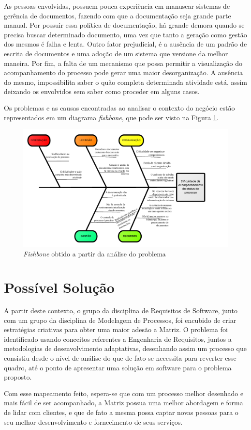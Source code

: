 As pessoas envolvidas, possuem pouca experiència em manusear 
sistemas de gerência de documentos, fazendo com que a documentação seja grande parte manual. Por 
possuir essa política de documentação, há grande demora quando se precisa buscar determinado 
documento, uma vez que tanto a geração como gestão dos mesmos é falha e lenta. Outro fator prejudicial, 
é a ausência de um padrão de escrita de documentos e uma adoção de um sistema que versione da melhor 
maneira. Por fim, a falta de um mecanismo que possa permitir a visualização do acompanhamento do processo
pode gerar uma maior desorganização. A ausência do mesmo, impossibilita saber o quão completa 
determinada atividade está, assim deixando os envolvidos sem saber como proceder
em alguns casos.

Os problemas e as causas encontradas ao analisar o contexto do negócio estão representados em 
um diagrama \textit{fishbone}, que pode ser visto na Figura \ref{fishbone}.
\begin{figure}[!htb]
\centering
\includegraphics[scale=0.6]{figuras/fish.png}
\caption{\textit{Fishbone} obtido a partir da análise do problema}
\label{fishbone}
\end{figure}
\section{Possível Solução}
A partir deste contexto, o grupo da disciplina de Requisitos de Software, junto com um 
grupo da disciplina de Modelagem de Processos, foi encubido de criar estratégias 
criativas para obter uma maior adesão a Matriz. O problema foi identificado
usando conceitos referentes a Engenharia de Requisitos, juntos a metodologias de 
desenvolvimento adaptativas, desenhando assim um processo que consistiu desde o nível 
de análise do que de fato se necessita para reverter esse quadro, até o ponto de 
apresentar uma solução em software para o problema proposto.

Com esse mapeamento feito, espera-se que com um processo melhor desenhado e mais fácil de ser
acompanhado, a Matriz possua uma melhor abordagem e forma de lidar com clientes, e que de fato
a mesma possa captar novas pessoas para o seu melhor desenvolvimento e fornecimento de seus serviços.
